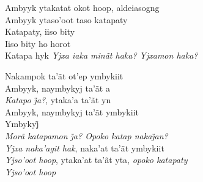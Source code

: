 \smallskip
 \begin{center}\end{center}
 \smallskip

\noindent   Ambyyk ytakatat okot hoop, aldeiasogng\\
  Ambyyk ytaso'oot taso katapaty\\
  Katapaty, iiso bity\\
  Iiso bity ho horot\\
  Katapa hyk
  \textit{Yjxa iaka minãt haka? Yjxamon haka?}

\smallskip
 \begin{center}\end{center}
 \smallskip

\noindent   Nakampok ta'ãt ot'ep ymbykiit\\
  Ambyyk, naymbykyj ta'ãt a\\
  \textit{Katapo j̃a?}, ytaka’a ta’ãt yn\\
  Ambyyk, naymbykyj ta'ãt ymbykiit\\
  Ymbykyj̃\\
  \textit{Morã katapamon j̃a? Opoko katap nakaj̃an?}\\
  \textit{Yjxa naka'agit hak}, naka'at ta'ãt ymbykiit\\
  \textit{Yjso'oot hoop}, ytaka'at ta'ãt yta, \textit{opoko katapaty}\\
  \textit{Yjso'oot hoop}

